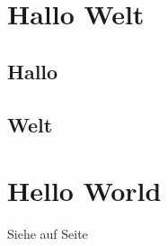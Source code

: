 \documentclass[12pt,ngerman]{scrartcl}
\begin{document}
\tableofcontents

\section{Hallo Welt}\label{sec:hello}
\subsection{Hallo}
\blindtext[10]

\subsection{Welt}
\blindtext[10]


\section{Hello World}

Siehe  auf Seite \pageref{sec:hello}
\end{document}
